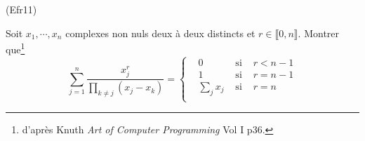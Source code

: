 \begin{tiny}(Efr11)\end{tiny} Soit $x_1,\cdots,x_n$ complexes non nuls deux à deux distincts et $r\in \llbracket 0,n\rrbracket$. Montrer que\footnote{d'après Knuth \emph{Art of Computer Programming} Vol I p36.}
\begin{displaymath}
  \sum_{j=1}^n \frac{x_j^r}{\prod_{k\neq j}(x_j-x_k)}
  =
\left\lbrace 
\begin{aligned}
  &0           &\text{ si } &r < n-1 \\
  &1           &\text{ si } &r = n-1 \\
  &\sum_j x_j  &\text{ si } &r = n \\
\end{aligned}
\right. 
\end{displaymath}

